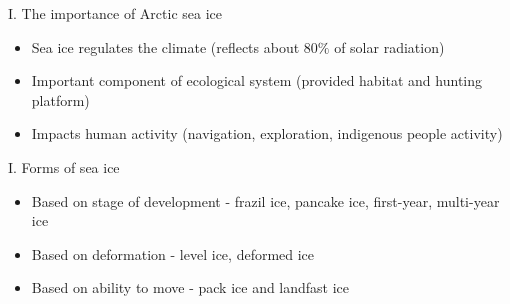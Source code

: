 \documentclass[8pt]{beamer}
\begin{document}
\setwatermark{\fontsize{125pt}{125pt}\selectfont{}}
\begin{frame}[fragile]{I. The importance of Arctic sea ice}
	\begin{itemize}
		\item Sea ice regulates the climate (reflects about 80$\%$ of solar radiation)
		\item Important component of ecological system (provided habitat and hunting platform)
		\item Impacts human activity (navigation, exploration, indigenous people activity)
	\end{itemize}
\end{frame}

\setwatermark{\fontsize{125pt}{125pt}\selectfont{}}
\begin{frame}[fragile]{I. Forms of sea ice}
	\begin{itemize}
		\item Based on stage of development - frazil ice, pancake ice, first-year, multi-year ice
		\item Based on deformation - level ice, deformed ice 
		\item Based on ability to move - pack ice and landfast ice
	\end{itemize}
\end{frame}

\end{document}
